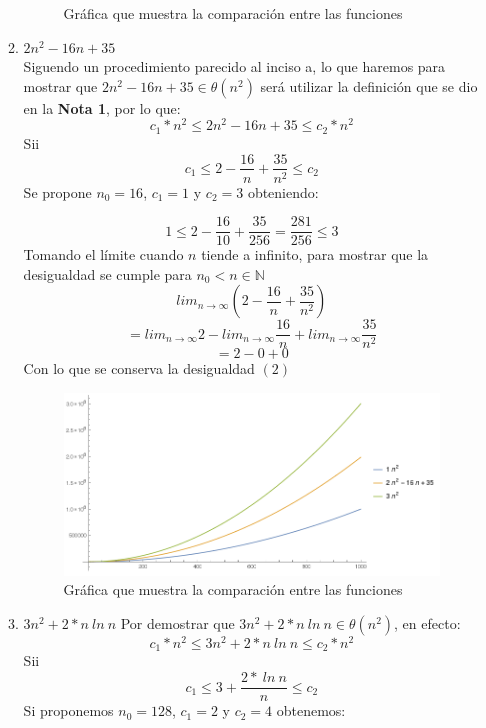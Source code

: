 \documentclass[11 pt, a4paper]{article}
\theoremstyle{definition}
\begin{document}
\begin{enumerate}
\begin{enumerate}
\begin{figure}[H]
          \caption{Gráfica que muestra la comparación entre las funciones}
      \end{figure}
  \item $2n^2 - 16 n + 35$\\
  Siguendo un procedimiento parecido al inciso a, lo que haremos 
  para mostrar que $2n^2 - 16 n + 35 \in \theta(n^2)$ será utilizar 
  la definición que se dio en la \textbf{Nota 1}, por lo que:
  \begin{equation}
   c_1*n^2 \leq 2n^2 - 16 n + 35 \leq c_2*n^2
  \end{equation}
  Sii
  \[c_1 \leq 2 - \frac{16}{n} + \frac{35}{n^2} \leq c_2 \]
  Se propone $n_0 = 16$, $c_1 = 1$ y $c_2 = 3$ obteniendo:
  
  \[ 1 \leq 2 - \frac{16}{10} + \frac{35}{256} = \frac{281}{256}\leq 3 \]
  Tomando el límite cuando $n$ tiende a infinito, para mostrar que la 
  desigualdad se cumple para  $n_0 < n \in \mathbb{N}$
  \[
   lim_{n \rightarrow \infty} \left( 2 - \frac{16}{n} + \frac{35}{n^2}\right)\]
   \[= lim_{n \rightarrow \infty} 2 - lim_{n \rightarrow \infty} \frac{16}{n} + lim_{n \rightarrow \infty} \frac{35}{n^2}\]
   \[= 2 - 0 +0   \]
  Con lo que se conserva la desigualdad $(2)$
    \begin{figure}[H]
         \centering
          \includegraphics[trim=0cm 0cm 0cm 0cm, width=15cm]{inciso2.png} 
          \caption{Gráfica que muestra la comparación entre las funciones}
      \end{figure}
   \item $3 n^2 + 2* n\ ln\ n$
  Por demostrar que $3 n^2 + 2* n\ ln\ n \in \theta (n^2) $, en efecto:
  \begin{equation}
      c_1*n^2 \leq 3 n^2 + 2 * n\ ln\ n\leq c_2*n^2
  \end{equation}
  Sii
  \[  c_1\leq 3 + \frac{2 * \ ln\ n} {n}\leq c_2\]
  Si proponemos $n_0 = 128$, $c_1= 2$ y $c_2 = 4 $ obtenemos:

\end{enumerate}
\end{enumerate}
\end{document}
